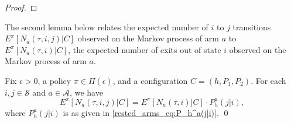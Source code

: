 \begin{proof}
%
\end{proof}

The second lemma below relates the expected number of $i$ to $j$ transitions $E^\pi[N_a(\tau,i,j)|C]$ observed on the Markov process of arm $a$ to $E^\pi[N_a(\tau,i)|C]$, the expected number of exits out of state $i$ observed on the Markov process of arm $a$.

\begin{lemma}\label{rested_arms_lemma:RelBtwNijAndNi}
	Fix $\epsilon>0$, a policy $\pi\in\Pi(\epsilon)$, and a configuration $C=(h,P_1,P_2)$. For each $i,j\in \mathcal{S}$ and $a\in \mathcal{A}$, we have
	\begin{equation}
	E^\pi[N_a(\tau,i,j)|C]=E^\pi[N_a(\tau,i)|C]\cdot P_{h}^a(j|i),\label{rested_arms_eq:RelBtwNijAndNi}
	\end{equation}
	where $P_h^a(j|i)$ is as given in \eqref{rested_arms_eq:P_h^a(j|i)}.
	\qed
\end{lemma}

